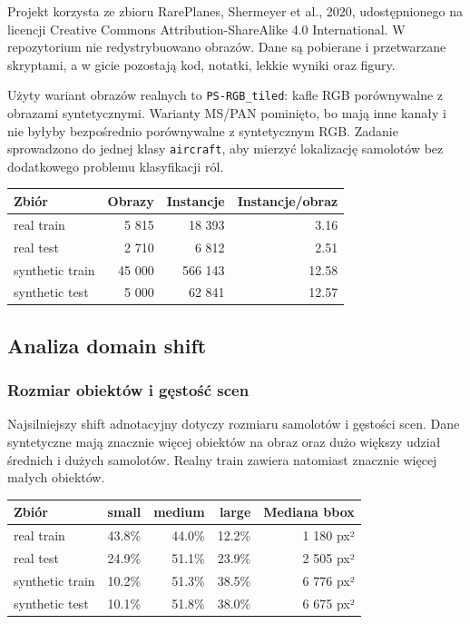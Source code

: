 \documentclass[
  11pt,
]{article}
\begin{document}
Projekt korzysta ze zbioru RarePlanes, Shermeyer et al., 2020,
udostępnionego na licencji Creative Commons Attribution-ShareAlike 4.0
International. W repozytorium nie redystrybuowano obrazów. Dane są
pobierane i przetwarzane skryptami, a w gicie pozostają kod, notatki,
lekkie wyniki oraz figury.

Użyty wariant obrazów realnych to \texttt{PS-RGB\_tiled}: kafle RGB
porównywalne z obrazami syntetycznymi. Warianty MS/PAN pominięto, bo
mają inne kanały i nie byłyby bezpośrednio porównywalne z syntetycznym
RGB. Zadanie sprowadzono do jednej klasy \texttt{aircraft}, aby mierzyć
lokalizację samolotów bez dodatkowego problemu klasyfikacji ról.

\begingroup
{}
\begin{tabularx}{\linewidth}{LRRR}
\toprule
Zbiór & Obrazy & Instancje & Instancje/obraz \\
\midrule

\bottomrule

real train & 5 815 & 18 393 & 3.16 \\
real test & 2 710 & 6 812 & 2.51 \\
synthetic train & 45 000 & 566 143 & 12.58 \\
synthetic test & 5 000 & 62 841 & 12.57 \\
\end{tabularx}
\endgroup


\hypertarget{analiza-domain-shift}{%
\subsection{Analiza domain shift}\label{analiza-domain-shift}}

\hypertarget{rozmiar-obiektuxf3w-i-gux119stoux15bux107-scen}{%
\subsubsection{Rozmiar obiektów i gęstość
scen}\label{rozmiar-obiektuxf3w-i-gux119stoux15bux107-scen}}

Najsilniejszy shift adnotacyjny dotyczy rozmiaru samolotów i gęstości
scen. Dane syntetyczne mają znacznie więcej obiektów na obraz oraz dużo
większy udział średnich i dużych samolotów. Realny train zawiera
natomiast znacznie więcej małych obiektów.

\begingroup
{}
\begin{tabularx}{\linewidth}{LRRRR}
\toprule
Zbiór & small & medium & large & Mediana bbox \\
\midrule

\bottomrule

real train & 43.8\% & 44.0\% & 12.2\% & 1 180 px² \\
real test & 24.9\% & 51.1\% & 23.9\% & 2 505 px² \\
synthetic train & 10.2\% & 51.3\% & 38.5\% & 6 776 px² \\
synthetic test & 10.1\% & 51.8\% & 38.0\% & 6 675 px² \\
\end{tabularx}
\endgroup
\end{document}
